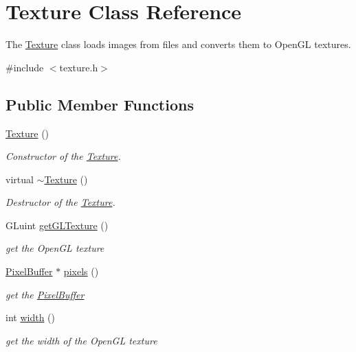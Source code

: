 \hypertarget{class_texture}{}\section{Texture Class Reference}
\label{class_texture}


The \hyperlink{class_texture}{Texture} class loads images from files and converts them to Open\+GL textures.  




{\ttfamily \#include $<$texture.\+h$>$}

\subsection*{Public Member Functions}
\begin{DoxyCompactItemize}
\item 
\hyperlink{class_texture_a6c275e3f186675ff6ed73ccf970e552f}{Texture} ()
\begin{DoxyCompactList}\small\item\em Constructor of the \hyperlink{class_texture}{Texture}. \end{DoxyCompactList}\item 
\mbox{\label{class_texture_a09c4bcb7462f64c1d20fa69dba3cee8a}} 
virtual \hyperlink{class_texture_a09c4bcb7462f64c1d20fa69dba3cee8a}{$\sim$\+Texture} ()
\begin{DoxyCompactList}\small\item\em Destructor of the \hyperlink{class_texture}{Texture}. \end{DoxyCompactList}\item 
G\+Luint \hyperlink{class_texture_a0c27269ad25e0d90b7bab79deaf39769}{get\+G\+L\+Texture} ()
\begin{DoxyCompactList}\small\item\em get the Open\+GL texture \end{DoxyCompactList}\item 
\hyperlink{struct_pixel_buffer}{Pixel\+Buffer} $\ast$ \hyperlink{class_texture_a6eb92d5d1c82b77fd2ced5c1b767dca1}{pixels} ()
\begin{DoxyCompactList}\small\item\em get the \hyperlink{struct_pixel_buffer}{Pixel\+Buffer} \end{DoxyCompactList}\item 
int \hyperlink{class_texture_a692f72a0e68a9ffa63d1a2e39644e7df}{width} ()
\begin{DoxyCompactList}\small\item\em get the width of the Open\+GL texture \end{DoxyCompactList}\item 

\end{DoxyCompactItemize}
